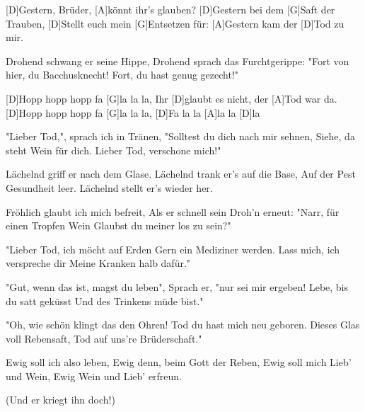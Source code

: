 

\begin{guitar}
	
	[D]Gestern, Brüder, [A]könnt ihr's glauben?
	[D]Gestern bei dem [G]Saft der Trauben,
	[D]Stellt euch mein [G]Entsetzen für:
	[A]Gestern kam der [D]Tod zu mir.
	
	Drohend schwang er seine Hippe,
	Drohend sprach das Furchtgerippe:
	"Fort von hier, du Bacchusknecht!
	Fort, du hast genug gezecht!"
	
	[D]Hopp hopp hopp fa [G]la la la,
	Ihr	[D]glaubt es nicht, der [A]Tod war da.
	[D]Hopp hopp hopp fa [G]la la la,
	[D]Fa la la	[A]la la [D]la
	
	"Lieber Tod,", sprach ich in Tränen,
	"Solltest du dich nach mir sehnen,
	Siehe, da steht Wein für dich.
	Lieber Tod, verschone mich!"
	
	Lächelnd griff er nach dem Glase.
	Lächelnd trank er's auf die Base,
	Auf der Pest Gesundheit leer.
	Lächelnd stellt er's wieder her.
	
	 
	
	\pagebreak
	
	Fröhlich glaubt ich mich befreit,
	Als er schnell sein Droh'n erneut:
	"Narr, für einen Tropfen Wein
	Glaubst du meiner los zu sein?"
	
	"Lieber Tod, ich möcht auf Erden
	Gern ein Mediziner werden.
	Lass mich, ich verspreche dir
	Meine Kranken halb dafür."
	
	 
	
	"Gut, wenn das ist, magst du leben",
	Sprach er, "nur sei mir ergeben!
	Lebe, bis du satt geküsst
	Und des Trinkens müde bist."
	
	"Oh, wie schön klingt das den Ohren!
	Tod du hast mich neu geboren.
	Dieses Glas voll Rebensaft,
	Tod auf uns're Brüderschaft."
	
	 
	
	Ewig soll ich also leben,
	Ewig denn, beim Gott der Reben,
	Ewig soll mich Lieb' und Wein,
	Ewig Wein und Lieb' erfreun.
	
	 
	
	(Und er kriegt ihn doch!)
\end{guitar}